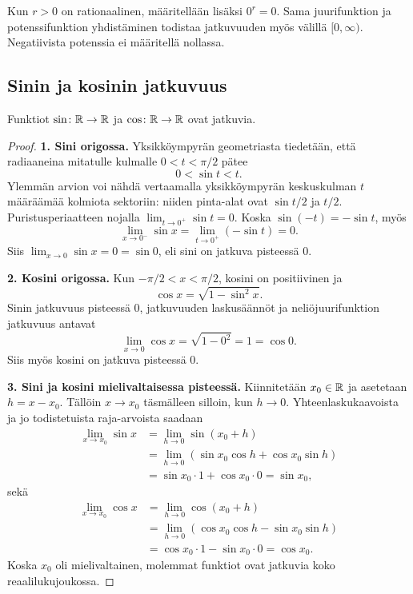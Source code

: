 \documentclass[11pt,a4paper]{amsart}
\begin{document}
\begin{remark}
  Kun $r>0$ on rationaalinen, määritellään lisäksi $0^r=0$.
  Sama juurifunktion ja potenssifunktion yhdistäminen todistaa
  jatkuvuuden myös välillä $[0,\infty)$.
  Negatiivista potenssia ei määritellä nollassa.
\end{remark}

\newpage
\subsection{Sinin ja kosinin jatkuvuus}

\begin{theorem}
  Funktiot $\sin\colon\mathbb{R}\to\mathbb{R}$ ja
  $\cos\colon\mathbb{R}\to\mathbb{R}$ ovat jatkuvia.
\end{theorem}
\begin{proof}
  \textbf{1. Sini origossa.}
  Yksikköympyrän geometriasta tiedetään, että radiaaneina
  mitatulle kulmalle $0<t<\pi/2$ pätee
  \[
    0<\sin t<t.
  \]
  Ylemmän arvion voi nähdä vertaamalla yksikköympyrän
  keskuskulman $t$ määräämää kolmiota sektoriin:
  niiden pinta-alat ovat $\sin t/2$ ja $t/2$.
  Puristusperiaatteen nojalla $\lim_{t\to0^+}\sin t=0$.
  Koska $\sin(-t)=-\sin t$, myös
  \[
    \lim_{x\to0^-}\sin x
    =\lim_{t\to0^+}(-\sin t)=0.
  \]
  Siis $\lim_{x\to0}\sin x=0=\sin0$, eli sini on jatkuva
  pisteessä $0$.

  \medskip
  \noindent\textbf{2. Kosini origossa.}
  Kun $-\pi/2<x<\pi/2$, kosini on positiivinen ja
  \[
    \cos x=\sqrt{1-\sin^2x}.
  \]
  Sinin jatkuvuus pisteessä $0$, jatkuvuuden laskusäännöt
  ja neliöjuurifunktion jatkuvuus antavat
  \[
    \lim_{x\to0}\cos x=\sqrt{1-0^2}=1=\cos0.
  \]
  Siis myös kosini on jatkuva pisteessä $0$.

  \medskip
  \noindent\textbf{3. Sini ja kosini mielivaltaisessa pisteessä.}
  Kiinnitetään $x_0\in\mathbb{R}$ ja asetetaan $h=x-x_0$.
  Tällöin $x\to x_0$ täsmälleen silloin, kun $h\to0$.
  Yhteenlaskukaavoista ja jo todistetuista raja-arvoista saadaan
  \begin{align*}
    \lim_{x\to x_0}\sin x
    &=\lim_{h\to0}\sin(x_0+h)\\
    &=\lim_{h\to0}(\sin x_0\cos h+\cos x_0\sin h)\\
    &=\sin x_0\cdot1+\cos x_0\cdot0=\sin x_0,
  \end{align*}
  sekä
  \begin{align*}
    \lim_{x\to x_0}\cos x
    &=\lim_{h\to0}\cos(x_0+h)\\
    &=\lim_{h\to0}(\cos x_0\cos h-\sin x_0\sin h)\\
    &=\cos x_0\cdot1-\sin x_0\cdot0=\cos x_0.
  \end{align*}
  Koska $x_0$ oli mielivaltainen, molemmat funktiot ovat
  jatkuvia koko reaalilukujoukossa.
\end{proof}
\end{document}
